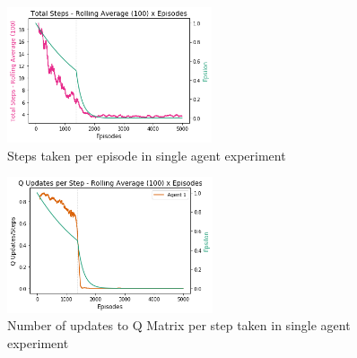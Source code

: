 \documentclass[11pt]{article}
\begin{document}
\begin{figure}[h]
    \includegraphics[height=4cm]{Images/exp_1/2_total_steps.png}
    \caption{Steps taken per episode in single agent experiment}
    \label{fig:exp1:steps}
\end{figure}
\begin{figure}[h]
    \includegraphics[height=4cm]{Images/exp_1/3_updates_per_step.png}
    \caption{Number of updates to Q Matrix per step taken in single agent experiment}
    \label{fig:exp1:updates}
\end{figure}
\end{document}
